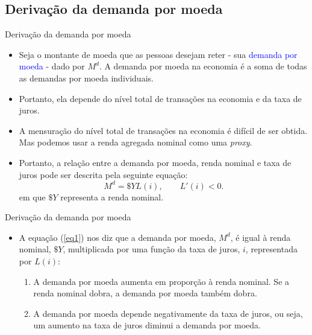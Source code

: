 \documentclass[10pt]{beamer}
\begin{document}
\subsection{Derivação da demanda por moeda}
\begin{frame}{Derivação da demanda por moeda}
\begin{itemize}
    \item Seja o montante de moeda que as pessoas desejam reter - sua \textcolor{blue}{demanda por moeda} - dado por $M^d$. A demanda por moeda na economia é a soma de todas as demandas por moeda individuais.
    \bigskip
    \item Portanto, ela depende do nível total de transações na economia e da taxa de juros.
    \bigskip
    \item A mensuração do nível total de transações na economia é difícil de ser obtida. Mas podemos usar a renda agregada nominal como uma \emph{proxy}.
    \bigskip
    \item Portanto, a relação entre a demanda por moeda, renda nominal e taxa de juros pode ser descrita pela seguinte equação:
    \begin{equation}
        M^d = \$Y L(i), \qquad L'(i) < 0.
        \label{eq1}
    \end{equation}
    em que $\$ Y$ representa a renda nominal.
\end{itemize}
\end{frame}

\begin{frame}{Derivação da demanda por moeda}
    \begin{itemize}
        \item A equação (\ref{eq1}) nos diz que a demanda por moeda, $M^d$, é igual à renda nominal, $\$Y$, multiplicada por uma função da taxa de juros, $i$, representada por $L(i)$:
        \bigskip
        \begin{enumerate}
            \item A demanda por moeda aumenta em proporção à renda nominal. Se a renda nominal dobra, a demanda por moeda também dobra.
            \bigskip
            \item A demanda por moeda depende negativamente da taxa de juros, ou seja, um aumento na taxa de juros diminui a demanda por moeda.
        \end{enumerate}
    \end{itemize}
\end{frame}
\end{document}
